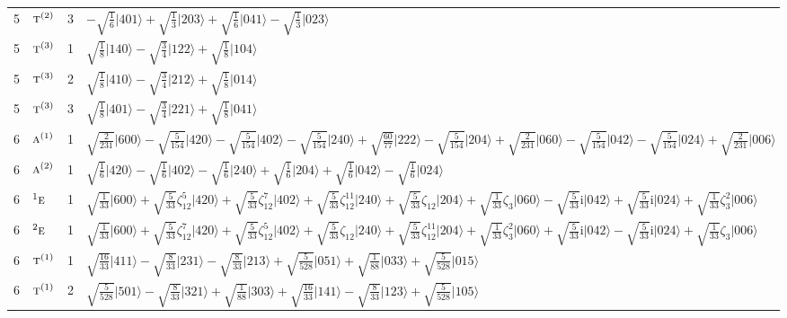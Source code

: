 \documentclass[11pt]{article}
\newcommand{\irr}[1]{\text{\normalfont\scshape #1}}
\newcommand{\conjpair}[1]{{}^{#1}}
\newcommand{\iunit}{\mathrm{i}}
\newcommand{\rootunity}[1]{\zeta_{#1}}
\newcommand{\occ}[1]{\lvert #1\rangle}
\begin{document}
\begin{longtable}{c l c p{}}
5 & $\irr{t}^{(2)}$ & 3 & $-\sqrt{\tfrac{1}{6}}\occ{401}+\sqrt{\tfrac{1}{3}}\occ{203}+\sqrt{\tfrac{1}{6}}\occ{041}-\sqrt{\tfrac{1}{3}}\occ{023}$\\
5 & $\irr{t}^{(3)}$ & 1 & $\sqrt{\tfrac{1}{8}}\occ{140}-\sqrt{\tfrac{3}{4}}\occ{122}+\sqrt{\tfrac{1}{8}}\occ{104}$\\
5 & $\irr{t}^{(3)}$ & 2 & $\sqrt{\tfrac{1}{8}}\occ{410}-\sqrt{\tfrac{3}{4}}\occ{212}+\sqrt{\tfrac{1}{8}}\occ{014}$\\
5 & $\irr{t}^{(3)}$ & 3 & $\sqrt{\tfrac{1}{8}}\occ{401}-\sqrt{\tfrac{3}{4}}\occ{221}+\sqrt{\tfrac{1}{8}}\occ{041}$\\
\hline
6 & $\irr{a}^{(1)}$ & 1 & $\sqrt{\tfrac{2}{231}}\occ{600}-\sqrt{\tfrac{5}{154}}\occ{420}-\sqrt{\tfrac{5}{154}}\occ{402}-\sqrt{\tfrac{5}{154}}\occ{240}+\sqrt{\tfrac{60}{77}}\occ{222}-\sqrt{\tfrac{5}{154}}\occ{204}+\sqrt{\tfrac{2}{231}}\occ{060}-\sqrt{\tfrac{5}{154}}\occ{042}-\sqrt{\tfrac{5}{154}}\occ{024}+\sqrt{\tfrac{2}{231}}\occ{006}$\\
6 & $\irr{a}^{(2)}$ & 1 & $\sqrt{\tfrac{1}{6}}\occ{420}-\sqrt{\tfrac{1}{6}}\occ{402}-\sqrt{\tfrac{1}{6}}\occ{240}+\sqrt{\tfrac{1}{6}}\occ{204}+\sqrt{\tfrac{1}{6}}\occ{042}-\sqrt{\tfrac{1}{6}}\occ{024}$\\
6 & $\conjpair{1}\irr{e}$ & 1 & $\sqrt{\tfrac{1}{33}}\occ{600}+\sqrt{\tfrac{5}{33}}\rootunity{12}^{5}\occ{420}+\sqrt{\tfrac{5}{33}}\rootunity{12}^{7}\occ{402}+\sqrt{\tfrac{5}{33}}\rootunity{12}^{11}\occ{240}+\sqrt{\tfrac{5}{33}}\rootunity{12}\occ{204}+\sqrt{\tfrac{1}{33}}\rootunity{3}\occ{060}-\sqrt{\tfrac{5}{33}}\iunit\occ{042}+\sqrt{\tfrac{5}{33}}\iunit\occ{024}+\sqrt{\tfrac{1}{33}}\rootunity{3}^{2}\occ{006}$\\
6 & $\conjpair{2}\irr{e}$ & 1 & $\sqrt{\tfrac{1}{33}}\occ{600}+\sqrt{\tfrac{5}{33}}\rootunity{12}^{7}\occ{420}+\sqrt{\tfrac{5}{33}}\rootunity{12}^{5}\occ{402}+\sqrt{\tfrac{5}{33}}\rootunity{12}\occ{240}+\sqrt{\tfrac{5}{33}}\rootunity{12}^{11}\occ{204}+\sqrt{\tfrac{1}{33}}\rootunity{3}^{2}\occ{060}+\sqrt{\tfrac{5}{33}}\iunit\occ{042}-\sqrt{\tfrac{5}{33}}\iunit\occ{024}+\sqrt{\tfrac{1}{33}}\rootunity{3}\occ{006}$\\
6 & $\irr{t}^{(1)}$ & 1 & $\sqrt{\tfrac{16}{33}}\occ{411}-\sqrt{\tfrac{8}{33}}\occ{231}-\sqrt{\tfrac{8}{33}}\occ{213}+\sqrt{\tfrac{5}{528}}\occ{051}+\sqrt{\tfrac{1}{88}}\occ{033}+\sqrt{\tfrac{5}{528}}\occ{015}$\\
6 & $\irr{t}^{(1)}$ & 2 & $\sqrt{\tfrac{5}{528}}\occ{501}-\sqrt{\tfrac{8}{33}}\occ{321}+\sqrt{\tfrac{1}{88}}\occ{303}+\sqrt{\tfrac{16}{33}}\occ{141}-\sqrt{\tfrac{8}{33}}\occ{123}+\sqrt{\tfrac{5}{528}}\occ{105}$\\

\end{longtable}
\end{document}
